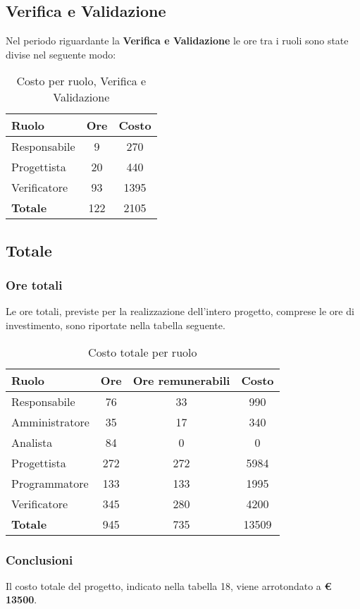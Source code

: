 \subsection{Verifica e Validazione}
Nel periodo riguardante la \textbf{Verifica e Validazione} le ore tra i ruoli sono state divise nel seguente modo:

\begin{table}[H]
	\begin{center}
		\begin{tabular}{|l|c|c|}
			\hline
			\textbf{Ruolo}	& \textbf{Ore} &	\textbf{Costo}	 \\
			\hline
			Responsabile	&	9	&	270		\\
			\hline
			Progettista		&	20	&	440		\\
			\hline
			Verificatore	&	93	&	1395	\\
			\hline
			\textbf{Totale}	&	122	&	2105	\\
			\hline
		\end{tabular}
	\end{center}
	\caption{Costo per ruolo, Verifica e Validazione}
\end{table}

\subsection{Totale}
\subsubsection{Ore totali}
Le ore totali, previste per la realizzazione dell'intero progetto, comprese le ore di investimento, sono riportate nella tabella seguente.

\begin{table}[H]
	\begin{center}
		\begin{tabular}{|l|c|c|c|}
			\hline
			\textbf{Ruolo}	& \textbf{Ore} &	\textbf{Ore remunerabili}	 &\textbf{Costo} \\
			\hline
			Responsabile	&	76	&	33	&	990	\\
			\hline
			Amministratore	&	35	&	17	&	340	\\
			\hline
			Analista		&	84	&	0	&	0	\\
			\hline
			Progettista		&	272	&	272	&	5984	\\
			\hline
			Programmatore	&	133	&	133	&	1995	\\
			\hline
			Verificatore	&	345	&	280	&	4200	\\
			\hline
			\textbf{Totale}	&	945	&	735	&	13509	\\
			\hline
		\end{tabular}
	\end{center}
	\caption{Costo totale per ruolo}
\end{table}

\subsubsection{Conclusioni}
Il costo totale del progetto, indicato nella tabella 18, viene arrotondato a \textbf{€ 13500}.\\
